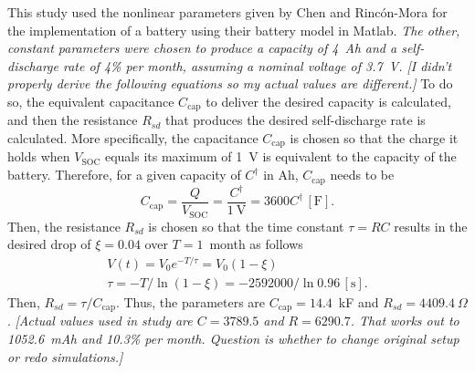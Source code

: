 \documentclass[../zhang_thesis.tex]{subfiles}
\begin{document}
This study used the nonlinear parameters given by Chen and Rinc\'on-Mora for the implementation of a battery using their battery model in Matlab. \emph{The other, constant parameters were chosen to produce a capacity of 4~Ah and a self-discharge rate of 4\% per month, assuming a nominal voltage of 3.7~V. [I didn't properly derive the following equations so my actual values are different.]} To do so, the equivalent capacitance $C_\text{cap}$ to deliver the desired capacity is calculated, and then the resistance $R_{sd}$
that produces the desired self-discharge rate is calculated. More specifically, the capacitance $C_\text{cap}$ is chosen so that the charge it holds when $V_\text{SOC}$ equals its maximum of 1~V is equivalent to the capacity of the battery. Therefore, for a given capacity of $C^\dag$ in Ah, $C_\text{cap}$ needs to be
\begin{equation}
    C_\text{cap} = \frac{Q}{V_\text{SOC}} = \frac{C^\dag}{1~\text{V}} = 3600 C^\dag \,[\text{F}].
\end{equation}
Then, the resistance $R_{sd}$ is chosen so that the time constant $\tau=RC$ results in the desired drop of $\xi=0.04$ over $T=1$~month as follows
\begin{gather}
    V(t) = V_0 e^{-T/\tau} = V_0 (1-\xi) \\
    \tau = -T/\ln(1-\xi) = -2592000/\ln 0.96 \,[\text{s}].
\end{gather}
Then, $R_{sd}=\tau/C_\text{cap}$. Thus, the parameters are $C_\text{cap}=14.4$~kF and $R_{sd}=4409.4~\Omega$. \emph{[Actual values used in study are $C=3789.5$ and $R=6290.7$. That works out to 1052.6~mAh and 10.3\% per month. Question is whether to change original setup or redo simulations.]}
\end{document}
